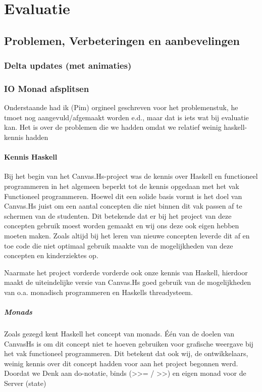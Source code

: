 \chapter{Evaluatie} \label{hoofdstuk:evaluatie}

\section{Problemen, Verbeteringen en aanbevelingen}
\subsection{Delta updates (met animaties)}
\subsection{IO Monad afsplitsen}

{\color{red} Onderstaande had ik (Pim) orgineel geschreven voor het problemenstuk, he tmoet nog aangevuld/afgemaakt worden e.d., maar dat is iets wat bij evaluatie kan. Het is over de problemen die we hadden omdat we relatief weinig haskell-kennis hadden}

\subsubsection{Kennis Haskell}
Bij het begin van het Canvas.Hs-project was de kennis over Haskell en functioneel programmeren in het algemeen beperkt tot de kennis opgedaan met het vak Functioneel programmeren. Hoewel dit een solide basis vormt is het doel van Canvas.Hs juist om een aantal concepten die niet binnen dit vak passen af te schermen van de studenten. Dit betekende dat er bij het project van deze concepten gebruik moest worden gemaakt en wij ons deze ook eigen hebben moeten maken. Zoals altijd bij het leren van nieuwe concepten leverde dit af en toe code die niet optimaal gebruik maakte van de mogelijkheden van deze concepten en kinderziektes op. 

Naarmate het project vorderde vorderde ook onze kennis van Haskell, hierdoor maakt de uiteindelijke versie van Canvas.Hs goed gebruik van de mogelijkheden van o.a. monadisch programmeren en Haskells threadysteem. 
\paragraph{Monads}
Zoals gezegd kent Haskell het concept van monads. Één van de doelen van CanvasHs is om dit concept niet te hoeven gebruiken voor grafische weergave bij het vak functioneel programmeren. Dit betekent dat ook wij, de ontwikkelaars, weinig kennis over dit concept hadden voor aan het project begonnen werd. Doordat we 
Denk aan do-notatie, binds (>>= / >>) en eigen monad voor de Server (state)

